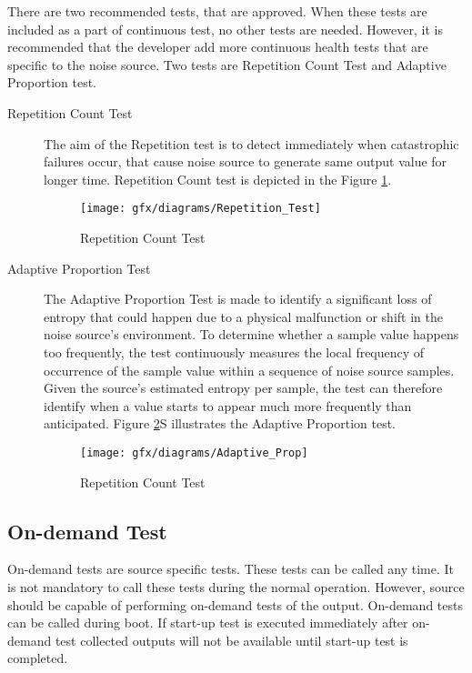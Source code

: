 There are two recommended tests, that are approved. When these tests are included as a part of continuous test, no other tests are needed. However, it is recommended that the developer add more continuous health tests that are specific to the noise source. Two tests are Repetition Count Test and Adaptive Proportion test.
\begin{description}
	\item[Repetition Count Test] The aim of the Repetition test is to detect immediately when catastrophic failures occur, that cause noise source to generate same output value for longer time. Repetition Count test is depicted in the Figure \ref{fig:2:7}. 
	\begin{figure}[h]
		\centering
		\texttt{[image: gfx/diagrams/Repetition\_Test]}
		\caption{Repetition Count Test}
		\label{fig:2:7}
	\end{figure}
	\item[Adaptive Proportion Test] The Adaptive Proportion Test is made to identify a significant loss of entropy that could happen due to a physical malfunction or shift in the noise source's environment. To determine whether a sample value happens too frequently, the test continuously measures the local frequency of occurrence of the sample value within a sequence of noise source samples. Given the source's estimated entropy per sample, the test can therefore identify when a value starts to appear much more frequently than anticipated. Figure \ref{fig:2:8}S  illustrates the Adaptive Proportion test.
	\begin{figure}[htbp]
		\centering
		\texttt{[image: gfx/diagrams/Adaptive\_Prop]}
		\caption{Repetition Count Test}
		\label{fig:2:8}
	\end{figure}
\end{description}

%
%
\subsection{On-demand Test}
\label{subsec:fundamentals:HTT:ODT}
On-demand tests are source specific tests. These tests can be called any time. It is not mandatory to call these tests during the normal operation. However, source should be capable of performing on-demand tests of the output. On-demand tests can be called during boot. If start-up test is executed immediately after on-demand test collected outputs will not be available until start-up test is completed.  

